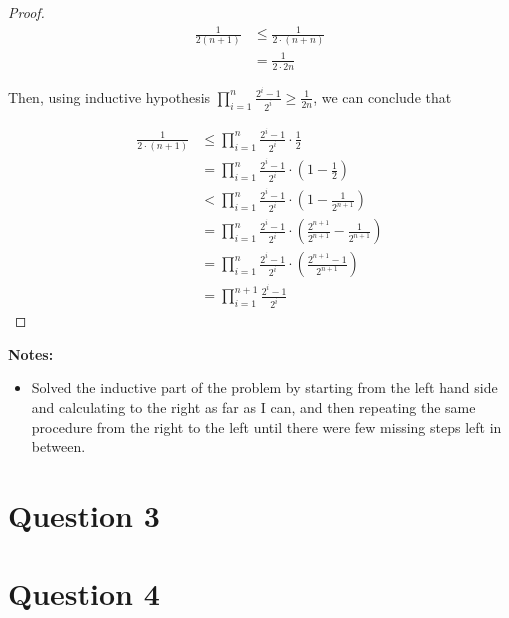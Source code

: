 \documentclass[12pt]{article}
\begin{document}
\begin{itemize}
\begin{proof}
        \begin{align}
            \frac{1}{2(n+1)} &\leq \frac{1}{2 \cdot (n+n)}\\
            &= \frac{1}{2 \cdot 2n}
        \end{align}

        \bigskip

        Then, using inductive hypothesis $\prod\limits_{i=1}^n \frac{2^i - 1}{2^i}
        \geq \frac{1}{2n}$, we can conclude that

        \begin{align}
            \frac{1}{2 \cdot (n+1)} &\leq \prod\limits_{i=1}^n \frac{2^i - 1}{2^i} \cdot \frac{1}{2}\\
            &= \prod\limits_{i=1}^n \frac{2^i - 1}{2^i} \cdot \left( 1 - \frac{1}{2} \right)\\
            &< \prod\limits_{i=1}^n \frac{2^i - 1}{2^i} \cdot \left( 1 - \frac{1}{2^{n+1}} \right)\\
            &= \prod\limits_{i=1}^n \frac{2^i - 1}{2^i} \cdot \left( \frac{2^{n+1}}{2^{n+1}} - \frac{1}{2^{n+1}} \right)\\
            &= \prod\limits_{i=1}^n \frac{2^i - 1}{2^i} \cdot \left( \frac{2^{n+1} - 1}{2^{n+1}} \right)\\
            &= \prod\limits_{i=1}^{n+1} \frac{2^i - 1}{2^i}
        \end{align}
    \end{proof}

    \bigskip

    \textbf{Notes:}

    \begin{itemize}
        \item Solved the inductive part of the problem by starting from the left
        hand side and calculating to the right as far as I can, and then repeating
        the same procedure from the right to the left until there were few missing
        steps left in between.
    \end{itemize}


\end{itemize}

\section*{Question 3}

\section*{Question 4}
\end{document}
